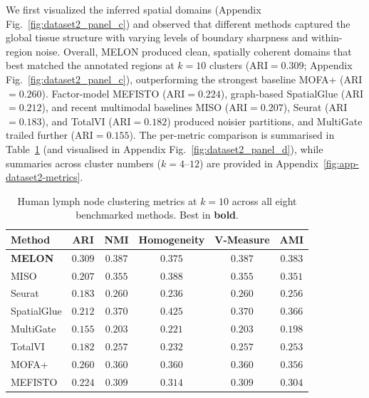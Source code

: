 \documentclass{article}
\theoremstyle{plain}
\theoremstyle{definition}
\begin{document}
We first visualized the inferred spatial domains (Appendix Fig.~\ref{fig:dataset2_panel_c}) and observed that different methods captured the global tissue structure with varying levels of boundary sharpness and within-region noise. Overall, MELON produced clean, spatially coherent domains that best matched the annotated regions at $k=10$ clusters (ARI$=0.309$; Appendix Fig.~\ref{fig:dataset2_panel_c}), outperforming the strongest baseline MOFA+ (ARI$=0.260$). Factor-model MEFISTO (ARI$=0.224$), graph-based SpatialGlue (ARI$=0.212$), and recent multimodal baselines MISO (ARI$=0.207$), Seurat (ARI$=0.183$), and TotalVI (ARI$=0.182$) produced noisier partitions, and MultiGate trailed further (ARI$=0.155$). The per-metric comparison is summarised in Table~\ref{tab:dataset2_metrics} (and visualised in Appendix Fig.~\ref{fig:dataset2_panel_d}), while summaries across cluster numbers ($k=4$--$12$) are provided in Appendix~\ref{fig:app-dataset2-metrics}.

\begin{table}[!htbp]
\centering
\caption{Human lymph node clustering metrics at $k{=}10$ across all eight benchmarked methods. Best in \textbf{bold}.}
\label{tab:dataset2_metrics}
\small
\begin{tabular}{lccccc}
\toprule
Method & ARI & NMI & Homogeneity & V-Measure & AMI \\
\midrule
\textbf{MELON}  & $\mathbf{0.309}$ & $\mathbf{0.387}$ & $0.375$ & $\mathbf{0.387}$ & $\mathbf{0.383}$ \\
MISO            & $0.207$ & $0.355$ & $0.388$ & $0.355$ & $0.351$ \\
Seurat          & $0.183$ & $0.260$ & $0.236$ & $0.260$ & $0.256$ \\
SpatialGlue     & $0.212$ & $0.370$ & $\mathbf{0.425}$ & $0.370$ & $0.366$ \\
MultiGate       & $0.155$ & $0.203$ & $0.221$ & $0.203$ & $0.198$ \\
TotalVI         & $0.182$ & $0.257$ & $0.232$ & $0.257$ & $0.253$ \\
MOFA+           & $0.260$ & $0.360$ & $0.360$ & $0.360$ & $0.356$ \\
MEFISTO         & $0.224$ & $0.309$ & $0.314$ & $0.309$ & $0.304$ \\
\bottomrule
\end{tabular}
\end{table}
\end{document}
